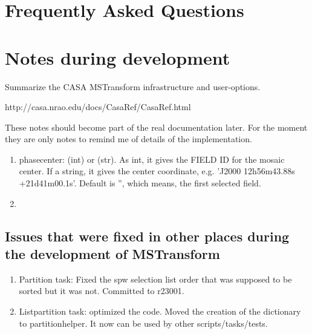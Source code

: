 \section{Frequently Asked Questions}\label{Sec:FAQ}


\section{Notes during development}

Summarize the CASA MSTransform infrastructure and user-options.

 {http://casa.nrao.edu/docs/CasaRef/CasaRef.html}

These notes should become part of the real documentation later. For the moment they are
only notes to remind me of details of the implementation.

\begin{enumerate}
\item phasecenter: (int) or (str). As int, it gives the FIELD ID for the mosaic center. If a string,
it gives the center coordinate, e.g. 'J2000 12h56m43.88s +21d41m00.1s'. Default is '', which means, the 
first selected field.
       
\item 
\end{enumerate}

\subsection{Issues that were fixed in other places during the development of MSTransform}
\begin{enumerate}
\item Partition task: Fixed the spw selection list order that was supposed to be sorted but it was not.
Committed to r23001.
\item Listpartition task: optimized the code. Moved the creation of the dictionary to partitionhelper. It
now can be used by other scripts/tasks/tests.
\end{enumerate}

